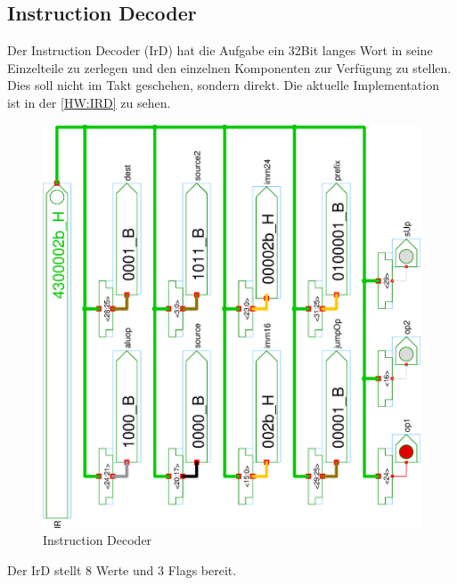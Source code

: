 \subsection{Instruction Decoder}
Der Instruction Decoder (IrD) hat die Aufgabe ein 32Bit langes Wort in seine Einzelteile zu zerlegen und den einzelnen Komponenten zur Verfügung zu stellen. Dies soll nicht im Takt geschehen, sondern direkt. Die aktuelle Implementation ist in der \autoref{HW:IRD} zu sehen.\\
\begin{figure}[!ht]
\centering
\hspace{-5em}
\includegraphics[width=1\textwidth,angle=270]{images/ir.eps}
\caption{\label{HW:IRD}Instruction Decoder}
\end{figure}%
Der IrD stellt 8 Werte und 3 Flags bereit.

